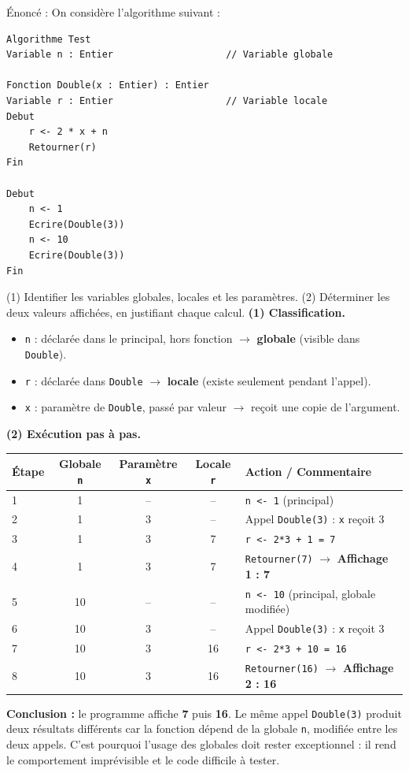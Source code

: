 \documentclass[11pt]{article}
\begin{document}
\begin{exoresolu}
Énoncé : On considère l'algorithme suivant :
\begin{lstlisting}
Algorithme Test
Variable n : Entier                    // Variable globale

Fonction Double(x : Entier) : Entier
Variable r : Entier                    // Variable locale
Debut
    r <- 2 * x + n
    Retourner(r)
Fin

Debut
    n <- 1
    Ecrire(Double(3))
    n <- 10
    Ecrire(Double(3))
Fin
\end{lstlisting}
(1) Identifier les variables globales, locales et les paramètres. (2) Déterminer les deux valeurs affichées, en justifiant chaque calcul.
\tcblower
\textbf{(1) Classification.}
\begin{itemize}
\item \texttt{n} : déclarée dans le principal, hors fonction $\to$ \textbf{globale} (visible dans \texttt{Double}).
\item \texttt{r} : déclarée dans \texttt{Double} $\to$ \textbf{locale} (existe seulement pendant l'appel).
\item \texttt{x} : paramètre de \texttt{Double}, passé par valeur $\to$ reçoit une copie de l'argument.
\end{itemize}

\textbf{(2) Exécution pas à pas.}

\begin{center}
\begin{tabularx}{\linewidth}{|l|c|c|c|X|}
\hline
\rowcolor{popblueL} Étape & Globale \texttt{n} & Paramètre \texttt{x} & Locale \texttt{r} & Action / Commentaire \\
\hline
1 & 1 & -- & -- & \texttt{n <- 1} (principal) \\
\hline
2 & 1 & 3 & -- & Appel \texttt{Double(3)} : \texttt{x} reçoit 3 \\
\hline
3 & 1 & 3 & 7 & \texttt{r <- 2*3 + 1 = 7} \\
\hline
4 & 1 & 3 & 7 & \texttt{Retourner(7)} $\to$ \textbf{Affichage 1 : 7} \\
\hline
5 & 10 & -- & -- & \texttt{n <- 10} (principal, globale modifiée) \\
\hline
6 & 10 & 3 & -- & Appel \texttt{Double(3)} : \texttt{x} reçoit 3 \\
\hline
7 & 10 & 3 & 16 & \texttt{r <- 2*3 + 10 = 16} \\
\hline
8 & 10 & 3 & 16 & \texttt{Retourner(16)} $\to$ \textbf{Affichage 2 : 16} \\
\hline
\end{tabularx}
\end{center}

\textbf{Conclusion :} le programme affiche \textbf{7} puis \textbf{16}. Le même appel \texttt{Double(3)} produit deux résultats différents car la fonction dépend de la globale \texttt{n}, modifiée entre les deux appels. C'est pourquoi l'usage des globales doit rester exceptionnel : il rend le comportement imprévisible et le code difficile à tester.
\end{exoresolu}
\end{document}
